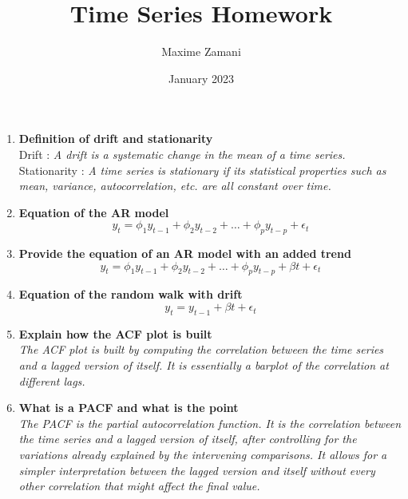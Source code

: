 \documentclass{article}
\title{Time Series Homework}
\author{Maxime Zamani}
\date{January 2023}
\begin{document}
\maketitle

\begin{enumerate}
    \item \textbf{Definition of drift and stationarity} \\
    Drift : \textit{A drift is a systematic change in the mean of a time series.} \\
    Stationarity : \textit{A time series is stationary if its statistical properties such as mean, variance, autocorrelation, etc. are all constant over time.} \\
    \item \textbf{Equation of the AR model} \\
    \begin{equation}
        y_t = \phi_1 y_{t-1} + \phi_2 y_{t-2} + \dots + \phi_p y_{t-p} + \epsilon_t
    \end{equation}
    \item \textbf{Provide the equation of an AR model with an added trend} \\
    \begin{equation}
        y_t = \phi_1 y_{t-1} + \phi_2 y_{t-2} + \dots + \phi_p y_{t-p} + \beta t + \epsilon_t
    \end{equation}
    \item \textbf{Equation of the random walk with drift}
    \begin{equation}
        y_t = y_{t-1} + \beta t + \epsilon_t
    \end{equation}
    \item \textbf{Explain how the ACF plot is built} \\
    \textit{The ACF plot is built by computing the correlation between the time series and a lagged version of itself. It is essentially a barplot of the correlation at different lags.} \\
    \item \textbf{What is a PACF and what is the point} \\
    \textit{The PACF is the partial autocorrelation function. It is the correlation between the time series and a lagged version of itself, after controlling for the variations already explained by the intervening comparisons. It allows for a simpler interpretation between the lagged version and itself without every other correlation that might affect the final value.} \\

\end{enumerate}
\end{document}
